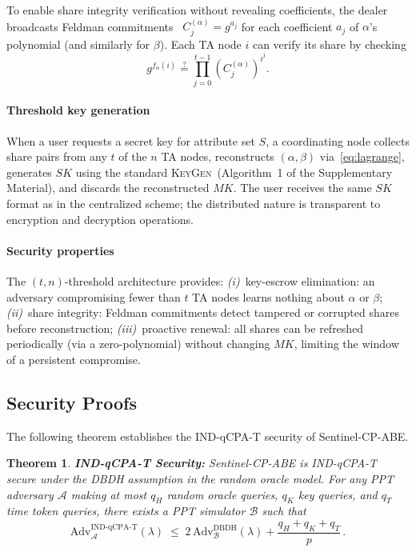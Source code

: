 \documentclass[lettersize,journal]{IEEEtran}
\newtheorem{theorem}{Theorem}
\begin{document}
To enable share integrity verification without revealing coefficients,
the dealer broadcasts Feldman commitments~\cite{Feldman1987}
$C_j^{(\alpha)} = g^{a_j}$ for each coefficient $a_j$ of
$\alpha$'s polynomial (and similarly for $\beta$). Each TA node $i$
can verify its share by checking
\[
g^{f_\alpha(i)} \stackrel{?}{=} \prod_{j=0}^{t-1} (C_j^{(\alpha)})^{i^j}.
\]

\paragraph{Threshold key generation}
When a user requests a secret key for attribute set $S$, a coordinating
node collects share pairs from any $t$ of the $n$ TA nodes, reconstructs
$(\alpha, \beta)$ via~\eqref{eq:lagrange}, generates $SK$ using
the standard \textsc{KeyGen}~(Algorithm~1 of the Supplementary Material), and discards
the reconstructed $MK$. The user receives the same $SK$ format as in the
centralized scheme; the distributed nature is transparent to encryption
and decryption operations.

\paragraph{Security properties}
The $(t,n)$-threshold architecture provides:
\textit{(i)}~key-escrow elimination: an adversary compromising fewer than
$t$ TA nodes learns nothing about $\alpha$ or $\beta$;
\textit{(ii)}~share integrity: Feldman commitments detect tampered or
corrupted shares before reconstruction;
\textit{(iii)}~proactive renewal: all shares can be refreshed
periodically (via a zero-polynomial) without changing $MK$,
limiting the window of a persistent compromise.

\subsection{Security Proofs}
\label{subsec:security_proofs}

The following theorem establishes the IND-qCPA-T security of Sentinel-CP-ABE.

\begin{theorem}
\label{thm:indscpat}
\textbf{IND-qCPA-T Security:}
Sentinel-CP-ABE is IND-qCPA-T secure under the DBDH assumption in the random oracle
model. For any PPT adversary $\mathcal{A}$ making at most $q_H$ random oracle
queries, $q_K$ key queries, and $q_T$ time token queries, there exists a PPT
simulator $\mathcal{B}$ such that
\begin{equation}
    \text{Adv}_{\mathcal{A}}^{\text{IND-qCPA-T}}(\lambda)
    \;\leq\;
    2\,\text{Adv}_{\mathcal{B}}^{\text{DBDH}}(\lambda)
    + \frac{q_H + q_K + q_T}{p}\,.
    \label{eq:security_bound}
\end{equation}
\end{theorem}
\end{document}
